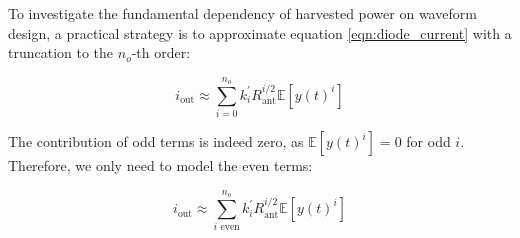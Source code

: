 To investigate the fundamental dependency of harvested power on waveform design, a practical strategy is to approximate equation \ref{eqn:diode_current} with a truncation to the ${n_o}$-th order:

\begin{equation}\label{eqn:output_current_truncation}
  {i_{{\text{out}}}} \approx \sum\limits_{i = 0}^{{n_o}} {k_i^\prime } R_{{\text{ant}}}^{i/2}\mathbb{E}\left[ {y{{(t)}^i}} \right]
\end{equation}

The contribution of odd terms is indeed zero, as $\mathbb{E}\left[ {y{{(t)}^i}} \right] = 0$ for odd $i$. Therefore, we only need to model the even terms:

\begin{equation}\label{eqn:output_current}
  {i_{{\text{out}}}} \approx \sum\limits_{i{\text{ even}}}^{{n_o}} {k_i^\prime } R_{{\text{ant}}}^{i/2}\mathbb{E}\left[ {y{{(t)}^i}} \right]
\end{equation}